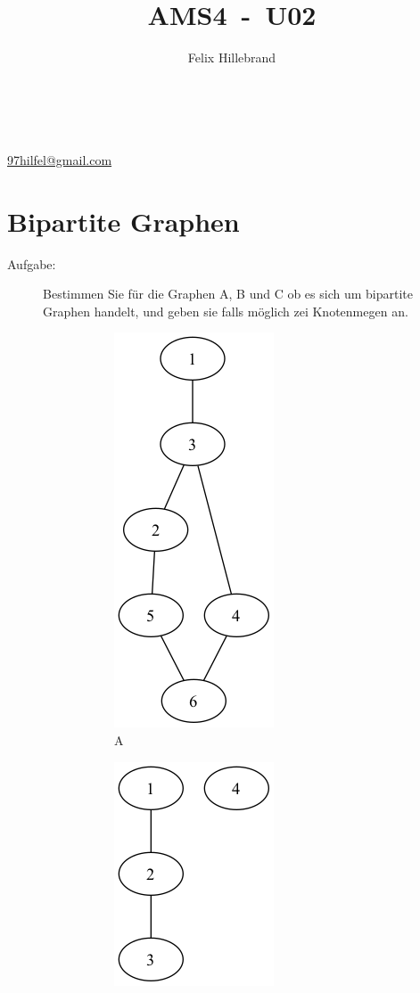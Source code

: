 \documentclass[a4paper,11pt]{report}
\author{Felix Hillebrand}
\makeatletter
\newcommand{\coverpage}{
    \thispagestyle{cover}
    \begin{center}
        {\LARGE \thetitle}\\[0.5cm]
        {\large \theauthor}\\
        \href{mailto:97hilfel@gmail.com}{97hilfel@gmail.com}\\
    \end{center}
    \tableofcontents
    \clearpage
}
\makeatother
\begin{document}

\title{AMS4~-~U02}
\coverpage

\clearpage
{}
\pagestyle{main}

\chapter{Bipartite Graphen}
    \begin{description}
        \item[Aufgabe:] Bestimmen Sie für die Graphen A, B und C ob es sich um bipartite Graphen handelt, und geben sie falls möglich zei Knotenmegen an. \hfill
        \begin{figure}[htbp]
            \centering
            \begin{subfigure}[b]{0.3\textwidth}
                \includegraphics[height=0.2\textheight]{notebooks/assets/aufgabe_01/A}
                \caption{A}
                \label{fig:a01_a}
            \end{subfigure}
            \hfill
            \begin{subfigure}[b]{0.3\textwidth}
                \includegraphics[height=0.2\textheight]{notebooks/assets/aufgabe_01/B}

\end{subfigure}
\end{figure}
\end{description}
\end{document}
